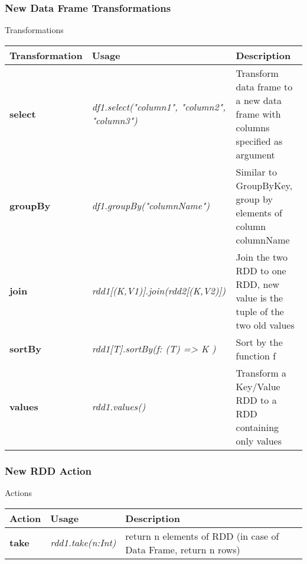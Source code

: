 \documentclass[slidetop,9pt,utf8]{beamer}
\begin{document}
\begin{CJK}{UTF8}{gbsn}
\begin{frame}
  \frametitle{New Data Frame Transformations}

  \begin{block}{Transformations}
    \begin{center}
      \begin{tabular}{|m{2.1cm}|m{3.5cm}|m{5cm}|}
        \hline 
        \rowcolor{gray} \textbf{Transformation} & \textbf{Usage} & \textbf{Description} \\ \hline
        \textbf{select} & \textit{df1.select("column1", "column2", "column3")} & Transform data frame to a new data frame with columns specified as argument \\ \hline
        \textbf{groupBy} & \textit{df1.groupBy(\newline"columnName"\newline)} & Similar to GroupByKey, group by elements of column columnName \\ \hline
        \textbf{join} & \textit{rdd1[(K,V1)]\newline  .join(rdd2[(K,V2)])} & Join the two RDD to one RDD, new value is the tuple of the two old values \\ \hline
        \textbf{sortBy} & \textit{rdd1[T]\newline  .sortBy(f: (T) =\textgreater\xspace K )} & Sort by the function f \\ \hline
        \textbf{values} & \textit{rdd1.values()} & Transform a Key/Value RDD to a RDD containing only values \\ \hline
      \end{tabular}
    \end{center}
  \end{block}

\end{frame}

\begin{frame}

  \frametitle{New RDD Action}

  \begin{block}{Actions}
    \begin{center}
      \begin{tabular}{|m{2.1cm}|m{3.5cm}|m{5cm}|}
        \hline 
        \rowcolor{gray} \textbf{Action} & \textbf{Usage} & \textbf{Description} \\ \hline
        \textbf{take} & \textit{rdd1.take(n:Int)} & return n elements of RDD (in case of Data Frame, return n rows) \\ \hline
      \end{tabular}
    \end{center}
  \end{block}


\end{frame}
\end{CJK}
\end{document}
